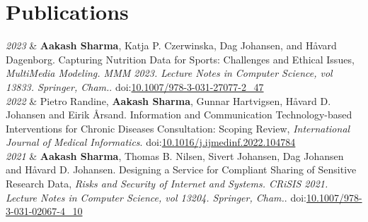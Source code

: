 \documentclass[11pt, a4paper]{article}
\newcommand{\DOI}[1]{doi:\href{https://doi.org/#1}{#1}}
\newcommand{\Year}[1]{\fontsize{10pt}{0}\selectfont #1}
\begin{document}
\section*{Publications}


\begin{EntriesTable}
	
	\Year{\textit{2023}}  &
	\textbf{Aakash Sharma}, Katja P. Czerwinska, Dag Johansen, and Håvard Dagenborg.
	Capturing Nutrition Data for Sports: Challenges and Ethical Issues,
	\emph{MultiMedia Modeling. MMM 2023. Lecture Notes in Computer Science, vol 13833. Springer, Cham.}. 
	\DOI{10.1007/978-3-031-27077-2\_47}
	\\
	
	
	\Year{\textit{2022}}  &
	Pietro Randine, \textbf{Aakash Sharma}, Gunnar Hartvigsen, Håvard D. Johansen and Eirik Årsand.
	Information and Communication Technology-based Interventions for Chronic Diseases Consultation: Scoping Review,
	\emph{International Journal of Medical Informatics}. 
	\DOI{10.1016/j.ijmedinf.2022.104784}
	\\
	
	
	\Year{\textit{2021}}  &
	\textbf{Aakash Sharma}, Thomas B. Nilsen, Sivert Johansen, Dag Johansen and Håvard D. Johansen.
	Designing a Service for Compliant Sharing of Sensitive Research Data,
	\emph{Risks and Security of Internet and Systems. CRiSIS 2021. Lecture Notes in Computer Science, vol 13204. Springer, Cham.}. 
	\DOI{10.1007/978-3-031-02067-4\_10}
	\\
	

\end{EntriesTable}
\end{document}
